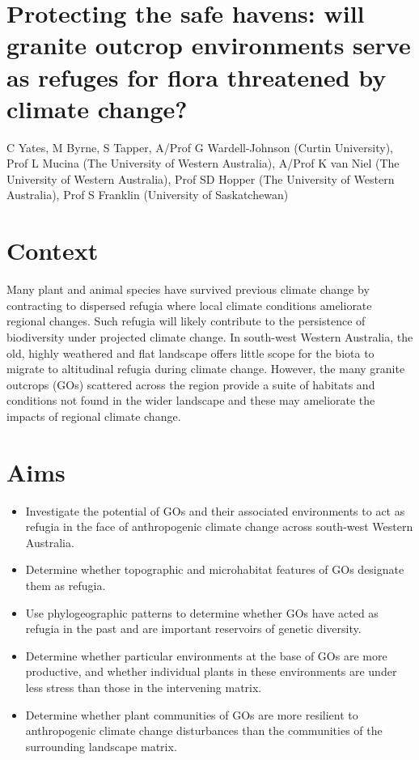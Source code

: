 \documentclass[version=last,
    paper=a4, %
    10pt, %
    usenames,
    dvipsnames,
    oneside, %
    headings=openany, %
    DIV=15 %
]{scrbook}
\begin{document}
\section*{Protecting the safe havens: will granite outcrop environments serve as
refuges for flora threatened by climate change?
}

C Yates, M Byrne, S Tapper, A/Prof G Wardell-Johnson (Curtin
University), Prof L Mucina (The University of Western Australia), A/Prof
K van Niel (The University of Western Australia), Prof SD Hopper (The
University of Western Australia), Prof S Franklin (University of
Saskatchewan)


\section*{Context}
Many plant and animal species have survived previous climate change by
contracting to dispersed refugia where local climate conditions
ameliorate regional changes. Such refugia will likely contribute to the
persistence of biodiversity under projected climate change. In
south-west Western Australia, the old, highly weathered and flat
landscape offers little scope for the biota to migrate to altitudinal
refugia during climate change. However, the many granite outcrops (GOs)
scattered across the region provide a suite of habitats and conditions
not found in the wider landscape and these may ameliorate the impacts of
regional climate change.



\section*{Aims}
\begin{itemize}
\itemsep1pt\parskip0pt
\item
  Investigate the potential of GOs and their associated environments to
  act as refugia in the face of anthropogenic climate change across
  south-west Western Australia.
\item
  Determine whether topographic and microhabitat features of GOs
  designate them as refugia.
\item
  Use phylogeographic patterns to determine whether GOs have acted as
  refugia in the past and are important reservoirs of genetic diversity.
\item
  Determine whether particular environments at the base of GOs are more
  productive, and whether individual plants in these environments are
  under less stress than those in the intervening matrix.
\item
  Determine whether plant communities of GOs are more resilient to
  anthropogenic climate change disturbances than the communities of the
  surrounding landscape matrix.
\end{itemize}
\end{document}
